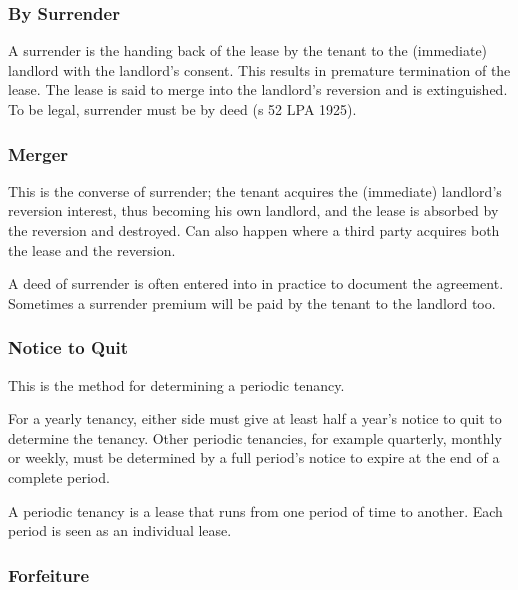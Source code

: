 \documentclass[
]{article}
\newenvironment{Shaded}{}{}
\newcommand{\NormalTok}[1]{#1}
\begin{document}
\hypertarget{by-surrender}{%
\subsubsection{By Surrender}\label{by-surrender}}

A surrender is the handing back of the lease by the tenant to the
(immediate) landlord with the landlord's consent. This results in
premature termination of the lease. The lease is said to merge into the
landlord's reversion and is extinguished. To be legal, surrender must be
by deed (s 52 LPA 1925).

\hypertarget{merger}{%
\subsubsection{Merger}\label{merger}}

This is the converse of surrender; the tenant acquires the (immediate)
landlord's reversion interest, thus becoming his own landlord, and the
lease is absorbed by the reversion and destroyed. Can also happen where
a third party acquires both the lease and the reversion.

A deed of surrender is often entered into in practice to document the
agreement. Sometimes a surrender premium will be paid by the tenant to
the landlord too.

\hypertarget{notice-to-quit}{%
\subsubsection{Notice to Quit}\label{notice-to-quit}}

This is the method for determining a periodic tenancy.

For a yearly tenancy, either side must give at least half a year's
notice to quit to determine the tenancy. Other periodic tenancies, for
example quarterly, monthly or weekly, must be determined by a full
period's notice to expire at the end of a complete period.

\begin{Shaded}
\begin{Highlighting}[]
\NormalTok{A periodic tenancy is a lease that runs from one period of time to another. Each period is seen as an individual lease.}
\end{Highlighting}
\end{Shaded}

\hypertarget{forfeiture}{%
\subsubsection{Forfeiture}\label{forfeiture}}
\end{document}

